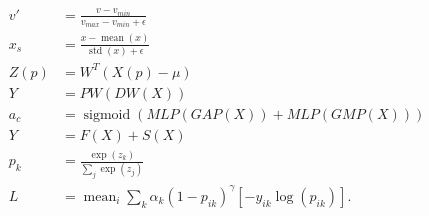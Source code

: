 \begin{align}
v' &= \frac{v-v_{min}}{v_{max}-v_{min}+\epsilon}\\
x_s &= \frac{x-\operatorname{mean}(x)}{\operatorname{std}(x)+\epsilon}\\
Z(p) &= W^T(X(p)-\mu)\\
Y &= PW(DW(X))\\
a_c &= \operatorname{sigmoid}(MLP(GAP(X))+MLP(GMP(X)))\\
Y &= F(X)+S(X)\\
p_k &= \frac{\exp(z_k)}{\sum_j\exp(z_j)}\\
L &= \operatorname{mean}_i\sum_k\alpha_k(1-p_{ik})^\gamma[-y_{ik}\log(p_{ik})].
\end{align}
